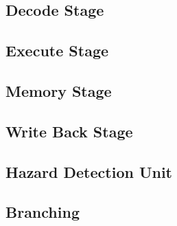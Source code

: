 \documentclass[12pt]{article}
\theoremstyle{plain}
\theoremstyle{definition}
\begin{document}
\subsection{Decode Stage}

\subsection{Execute Stage}

\subsection{Memory Stage}

\subsection{Write Back Stage}

\subsection{Hazard Detection Unit}

\subsection{Branching}


			
\end{document}
